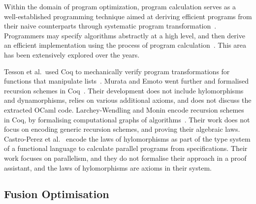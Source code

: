 \documentclass[a4paper,anonymous, UKenglish,cleveref, autoref, thm-restate]{lipics-v2021}
\begin{document}
Within the domain of program optimization, program calculation serves as a
well-established programming technique aimed at deriving efficient programs from
their naive counterparts through systematic program
transformation~\cite{gibbonsSquiggol}. Programmers may specify algorithms
abstractly at a high level, and then derive an efficient implementation using
the process of program calculation~\cite{BirddeMoor96:Algebra}. This area has
been extensively explored over the years.

Tesson et al.\ used Coq to mechanically verify program transformations for functions that manipulate lists~\cite{10.1007/978-3-642-17796-5_10}.
Murata and Emoto went further and
formalised recursion schemes in Coq~\cite{MurataE19}. Their development does not
include hylomorphisms and dynamorphisms, relies on various additional axioms, and does not discuss the extracted OCaml code.
Larchey-Wendling and Monin encode recursion schemes in
Coq, by formalising computational graphs of algorithms~\cite{larchey2022braga}.
Their work does not focus on encoding generic recursion schemes, and proving
their algebraic laws. Castro-Perez et al.~\cite{farmsCastro} encode the laws of
hylomorphisms as part of the type system of a functional language to calculate
parallel programs from specifications. Their work focuses on parallelism, and
they do not formalise their approach in a proof assistant, and the laws of
hylomorphisms are axioms in their system.

\subsection{Fusion Optimisation}\label{sec:fusion}
\end{document}
